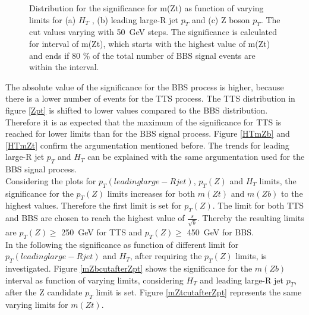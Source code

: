 \begin{figure}[h!]
    \centering
    \centering
    \centering
    \caption{Distribution for the significance for m(Zt) as function of varying limits for (a) $H_{T}$ , (b) leading large-R jet $p_{T}$ and (c) Z boson $p_{T}$.
    The cut values varying with \SI{50}{GeV} steps.
    The significance is calculated for interval of m(Zt), which starts with the highest value of m(Zt) and ends if 80 \% of the total number of BBS signal events are within the interval.}
    \label{mZtcut}   
\end{figure}
    


The absolute value of the significance for the BBS process is higher, because there is a lower number of events for the TTS process.
The TTS distribution in figure \ref{Zpt} is shifted to lower values compared to the BBS distribution. 
Therefore it is as expected that the maximum of the significance for TTS is reached for lower limits than for the BBS signal process.
Figure \ref{HTmZb} and \ref{HTmZt} confirm the argumentation mentioned before.
The trends for leading large-R jet $p_{T}$ and $H_{T}$ can be explained with the same argumentation used for the BBS signal process.\\ 
Considering the plots for $p_{T}(leading large-R jet)$, $p_{T}(Z)$ and $H_{T}$ limits, the significance for the $p_{T}(Z)$ limits increases for both $m(Zt)$ and $m(Zb)$ to the highest values.  
Therefore the first limit is set for $p_{T}(Z)$.
The limit for both TTS and BBS are chosen to reach the highest value of $\frac{s}{\sqrt{b}}$.
Thereby the resulting limits are $p_{T}(Z) \geq$ \SI{250}{GeV} for TTS and $p_{T}(Z) \geq$ \SI{450}{GeV} for BBS. \\
In the following the significance as function of different limit for $p_{T}(leading large-R jet)$ and $H_{T}$, after requiring the $p_{T}(Z)$ limits, is investigated.
Figure \ref{mZbcutafterZpt} shows the significance for the $m(Zb)$ interval as function of varying limits, considering $H_{T}$ and leading large-R jet $p_{T}$, after the Z candidate $p_{T}$ limit is set.
Figure \ref{mZtcutafterZpt} represents the same varying limits for $m(Zt)$.

